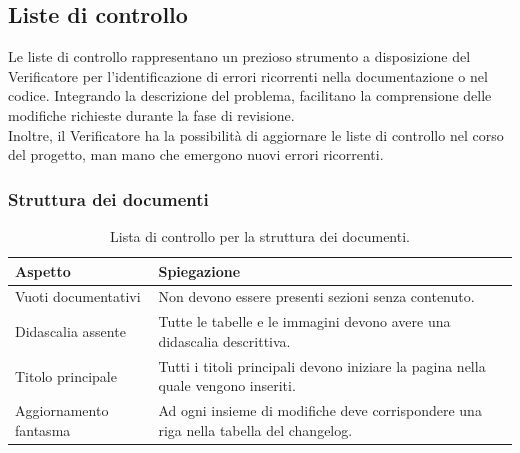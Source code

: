 \documentclass[8pt]{article}
\begin{document}
\subsection{Liste di controllo}\label{sec:liste controllo}
Le liste di controllo rappresentano un prezioso strumento a disposizione del
Verificatore per l'identificazione di errori ricorrenti nella documentazione o nel codice. Integrando la descrizione del problema, facilitano la comprensione delle modifiche richieste durante la fase di revisione.
\\
Inoltre, il Verificatore ha la possibilità di aggiornare le liste di controllo nel corso del progetto, man mano che emergono nuovi errori ricorrenti.
\subsubsection{Struttura dei documenti}
\renewcommand{\arraystretch}{2.5}
\begin{longtable}{|>{\centering}p{5cm}|>{\centering\arraybackslash}p{10cm}|}
\hline
\rowcolor{white}
    \textbf{Aspetto} & \textbf{Spiegazione} \\
\hline
\endfirsthead
\rowcolor{white}
\caption{Lista di controllo per la struttura dei documenti.}
\label{table:Lista di controllo per la struttura dei documenti}
\endlastfoot
    Vuoti documentativi & Non devono essere presenti sezioni senza contenuto. \\
\hline
    Didascalia assente & Tutte le tabelle e le immagini devono avere una didascalia descrittiva. \\
\hline    
Titolo principale & Tutti i titoli principali devono iniziare la pagina nella quale vengono
    inseriti. \\
\hline
    Aggiornamento fantasma & Ad ogni insieme di modifiche deve corrispondere una riga nella tabella
    del changelog. \\


    \hline
\end{longtable}
\end{document}
